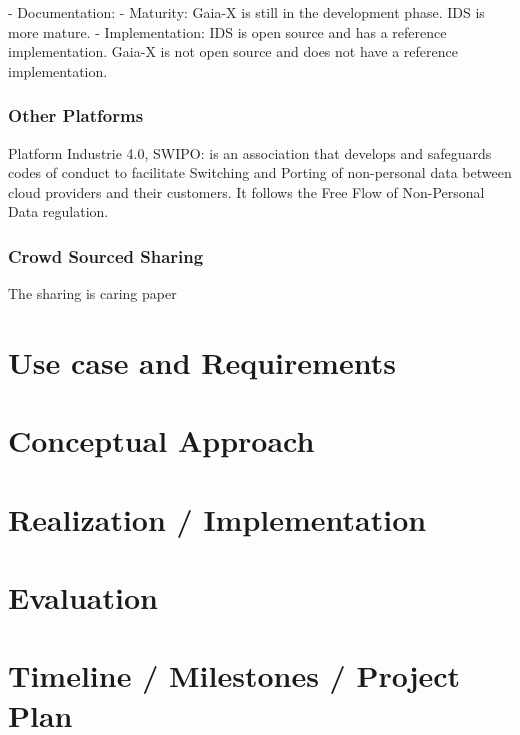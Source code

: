 \documentclass{article}
\begin{document}
- Documentation: 
- Maturity: Gaia-X is still in the development phase. IDS is more mature.
- Implementation: IDS is open source and has a reference implementation. Gaia-X is not open source and does not have a reference implementation.



\subsubsection*{Other Platforms}
Platform Industrie 4.0, 
SWIPO: is an association that develops and safeguards codes of conduct to facilitate Switching and Porting of non-personal data between cloud providers and their customers.
It follows the Free Flow of Non-Personal Data regulation.

\subsubsection*{Crowd Sourced Sharing}
The sharing is caring paper \cite{jesus_sharing_2023}

\section{Use case and Requirements} %

\section{Conceptual Approach} %

\section{Realization / Implementation} %


\section{Evaluation} %

\section{Timeline / Milestones / Project Plan} %

 

\end{document}
